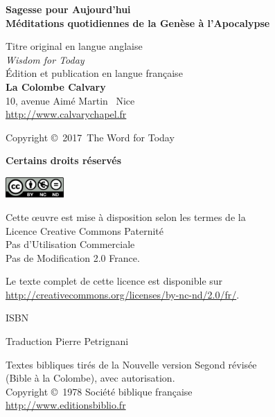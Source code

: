 \newpage
\mbox{}
\vfill

{\scriptsize

{\bfseries Sagesse pour Aujourd'hui\\
 Méditations quotidiennes de la Genèse à l'Apocalypse}

Titre original en langue anglaise\frcolon{}\\
\emph{Wisdom for Today} \\

Édition et publication en langue fran\c{c}aise\frcolon{}\\
 {\bfseries La Colombe Calvary}\\
 10, avenue Aimé Martin ~Nice\\
 \url{http://www.calvarychapel.fr}

Copyright \copyright{}~2017~The Word for Today

{\bfseries Certains droits réservés}

\includegraphics[width=6em]{by-nc-nd_eu}

Cette \oe{}uvre est mise à disposition selon les termes de la \\
 Licence Creative Commons Paternité \\
 \ocadr Pas d'Utilisation Commerciale \\
 \ocadr Pas de Modification 2.0 France.

Le texte complet de cette licence est disponible sur \\
 \url{http://creativecommons.org/licenses/by-nc-nd/2.0/fr/}.

ISBN~\isbn

Traduction\frcolon{} Pierre Petrignani

Textes bibliques tirés de la Nouvelle version Segond révisée \\
 (Bible à la Colombe), avec autorisation. \\
 Copyright \copyright{}~1978 Société biblique fran\c{c}aise \\
 \url{http://www.editionsbiblio.fr}

}
\pagebreak

